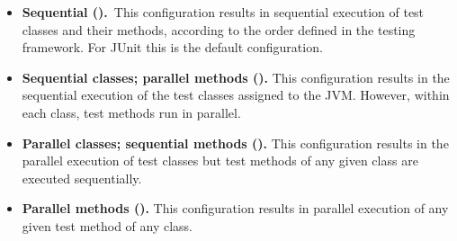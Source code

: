 \begin{itemize}
\item \textbf{Sequential (\Seq).}~This configuration results in
  sequential execution of test classes and their methods, according to
  the order defined in the testing framework.  For JUnit
  this is the default configuration.
\item \textbf{Sequential classes; parallel methods
  (\ParClassSeqMeth{}).} This configuration results in the sequential
  execution of the test classes assigned to the JVM.  However, within
  each class, test methods run in parallel.
\item \textbf{Parallel classes; sequential methods
  (\SeqClassParMeth{}).}  This configuration results in the parallel
  execution of test classes but test methods of any given class are
  executed sequentially.
\item \textbf{Parallel methods (\ParClassParMeth).} This configuration
  results in parallel execution of any given test method of any class.
\end{itemize}


